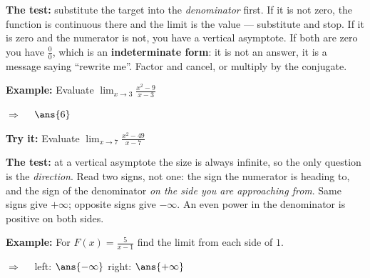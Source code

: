 \documentclass[12pt]{article}
\begin{document}


\begin{formulabox}
\textbf{The test:} substitute the target into the \emph{denominator} first.
If it is not zero, the function is continuous there and the limit is the value
--- substitute and stop. If it is zero and the numerator is not, you have a
vertical asymptote. If both are zero you have $\frac{0}{0}$, which is an
\textbf{indeterminate form}: it is not an answer, it is a message saying
``rewrite me''. Factor and cancel, or multiply by the conjugate.
\end{formulabox}

\begin{examplebox}
\textbf{Example:} \quad Evaluate $\displaystyle\lim_{x \to 3} \frac{x^2-9}{x-3}$

$\Rightarrow\quad$ $\ans{6}$
\end{examplebox}

\begin{tryitbox}
\textbf{Try it:} \quad Evaluate $\displaystyle\lim_{x \to 7} \frac{x^2-49}{x-7}$\\[2pt]
\end{tryitbox}


\begin{formulabox}
\textbf{The test:} at a vertical asymptote the size is always infinite, so the
only question is the \emph{direction}. Read two signs, not one: the sign the
numerator is heading to, and the sign of the denominator \emph{on the side you
are approaching from}. Same signs give $+\infty$; opposite signs give $-\infty$.
An even power in the denominator is positive on both sides.
\end{formulabox}

\begin{examplebox}
\textbf{Example:} \quad For $\displaystyle F(x) = \frac{5}{x-1}$ find the limit
from each side of $1$.

$\Rightarrow\quad$ left: $\ans{-\infty}$ \quad right: $\ans{+\infty}$
\end{examplebox}
\end{document}
